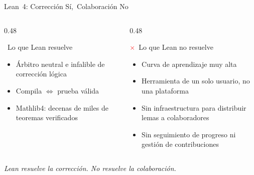 \documentclass[aspectratio=169, 10pt]{beamer}
\newcommand{\yes}{\textcolor{cpTeal}{\checkmark}}
\newcommand{\no}{\textcolor{red}{$\times$}}
\begin{document}
\begin{frame}{Lean~4: Correcci\'{o}n S\'{i},\ Colaboraci\'{o}n No}
  \begin{columns}[T]
    \begin{column}{0.48\textwidth}
      \begin{block}{\yes\ Lo que Lean resuelve}
        \begin{itemize}
          \item \'{A}rbitro neutral e infalible de correcci\'{o}n l\'{o}gica
          \item Compila $\Leftrightarrow$ prueba v\'{a}lida
          \item Mathlib4: decenas de miles de teoremas verificados
        \end{itemize}
      \end{block}
    \end{column}
    \begin{column}{0.48\textwidth}
      \begin{alertblock}{\no\ Lo que Lean no resuelve}
        \begin{itemize}
          \item Curva de aprendizaje muy alta
          \item Herramienta de un solo usuario, no una plataforma
          \item Sin infraestructura para distribuir lemas a colaboradores
          \item Sin seguimiento de progreso ni gesti\'{o}n de contribuciones
        \end{itemize}
      \end{alertblock}
    \end{column}
  \end{columns}
  \vspace{0.5cm}
  \begin{center}
    \large\color{cpBlue}
    \textit{Lean resuelve la correcci\'{o}n. No resuelve la colaboraci\'{o}n.}
  \end{center}
\end{frame}
\end{document}
